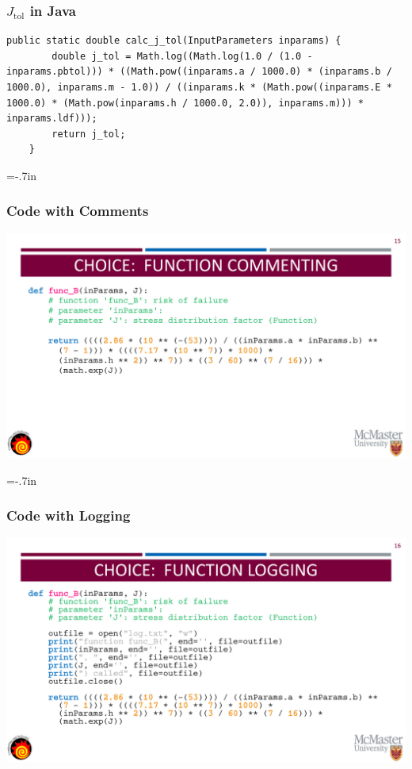 \documentclass{beamer}
\begin{document}

\begin{frame}

\frametitle{$J_{\mbox{tol}}$ in Java}

\begin{lstlisting}
public static double calc_j_tol(InputParameters inparams) {
        double j_tol = Math.log((Math.log(1.0 / (1.0 - inparams.pbtol))) * ((Math.pow((inparams.a / 1000.0) * (inparams.b / 1000.0), inparams.m - 1.0)) / ((inparams.k * (Math.pow((inparams.E * 1000.0) * (Math.pow(inparams.h / 1000.0, 2.0)), inparams.m))) * inparams.ldf)));
        return j_tol;
    }
\end{lstlisting}
\end{frame}


\hoffset=-.7in 
\begin{frame}
\frametitle{Code with Comments}
\includegraphics[width=1.2\textwidth]{CommentingOn.pdf}
\end{frame}
\hoffset=0in


\hoffset=-.7in 
\begin{frame}
\frametitle{Code with Logging}
\includegraphics[width=1.2\textwidth]{LoggingOn.pdf}
\end{frame}
\hoffset=0in
\end{document}

